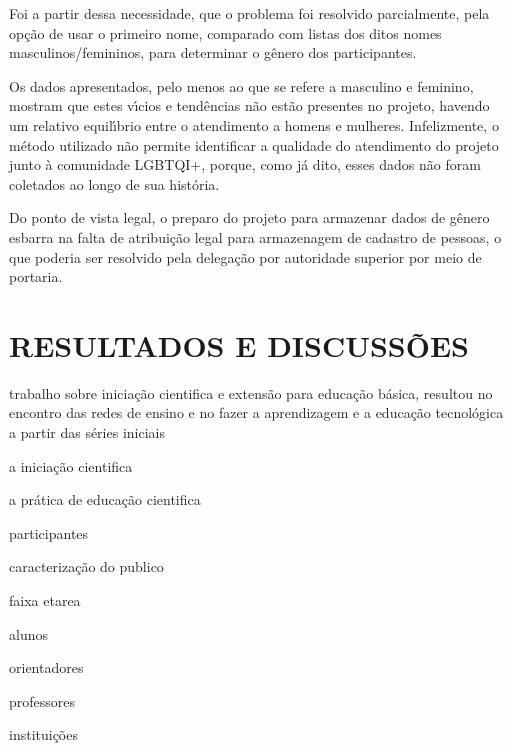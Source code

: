 \documentclass[
12pt,		%
openright,	%
twoside,  %
a4paper,			%
chapter=TITLE,		%
english,			%
french,				%
spanish,			%
brazil				%
]{USPSC-classe/USPSC}
\begin{document}
Foi a partir dessa necessidade, que o problema foi resolvido parcialmente, pela op\c{c}\~ao de usar o primeiro nome, comparado com listas dos ditos nomes masculinos/femininos, para determinar o g\^enero dos participantes.




Os dados apresentados, pelo menos ao que se refere a masculino e feminino, mostram que estes v\'{\i}cios e tend\^encias n\~ao est\~ao presentes no projeto, havendo um relativo equil\'{\i}brio entre o atendimento a homens e mulheres. Infelizmente, o m\'etodo utilizado n\~ao permite identificar a qualidade do atendimento do projeto junto \`a comunidade LGBTQI+, porque, como j\'a dito, esses dados n\~ao foram coletados ao longo de sua hist\'oria.




Do ponto de vista legal, o preparo do projeto para armazenar dados de g\^enero esbarra na falta de atribui\c{c}\~ao legal para armazenagem de cadastro de pessoas, o que poderia ser resolvido pela delega\c{c}\~ao por autoridade superior por meio de portaria.




\chapter[RESULTADOS E DISCUSS\~OES]{RESULTADOS E DISCUSS\~OES}\label{RESULTADOS E DISCUSS\~OES}
trabalho sobre inicia\c{c}\~ao  cientifica e extens\~ao para educa\c{c}\~ao b\'asica, resultou no encontro das redes de ensino  e no fazer a aprendizagem e  a educa\c{c}\~ao tecnol\'ogica   a partir das s\'eries iniciais




a inicia\c{c}\~ao cientifica




a pr\'atica de educa\c{c}\~ao cientifica




participantes




 caracteriza\c{c}\~ao do publico




faixa etarea




alunos




orientadores




professores




institui\c{c}\~oes
\end{document}
